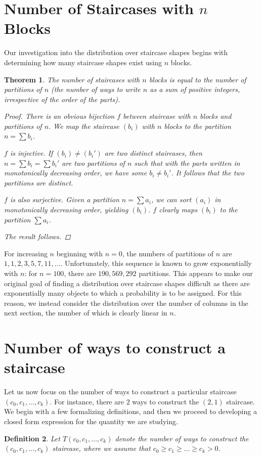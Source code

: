 \documentclass[12pt]{amsart}
\newtheorem{theorem}{Theorem}[section]
\newtheorem{definition}[theorem]{Definition}
\newcommand{\newsection}[2]{
\section{#1 \label{#2}}
}
\begin{document}
\newsection{Number of Staircases with $n$ Blocks}{sec:numstaircases}
Our investigation into the distribution over staircase shapes begins with determining how many staircase shapes exist using $n$ blocks.

\begin{theorem}
The number of staircases with $n$ blocks is equal to the number of partitions of $n$ (the number of ways to write $n$ as a sum of positive integers, irrespective of the order of the parts).
\begin{proof}
There is an obvious bijection $f$ between staircase with $n$ blocks and partitions of $n$. We map the staircase $(b_i)$ with $n$ blocks to the partition $n=\sum b_i$.

$f$ is injective. If $(b_i)\neq (b_i')$ are two distinct staircases, then $n = \sum b_i = \sum b_i'$ are two partitions of $n$ such that with the parts written in monotonically decreasing order, we have some $b_i\neq b_i'$. It follows that the two partitions are distinct.

$f$ is also surjective. Given a partition $n = \sum a_i$, we can sort $(a_i)$ in monotonically decreasing order, yielding $(b_i)$. $f$ clearly maps $(b_i)$ to the partition $\sum a_i$.

The result follows.
\end{proof}
\end{theorem}

For increasing $n$ beginning with $n = 0$, the numbers of partitions of $n$ are $1, 1, 2, 3, 5, 7, 11, \ldots$. Unfortunately, this sequence is known to grow exponentially with $n$: for $n = 100$, there are $190,569,292$ partitions. This appears to make our original goal of finding a distribution over staircase shapes difficult as there are exponentially many objects to which a probability is to be assigned. For this reason, we instead consider the distribution over the number of columns in the next section, the number of which is clearly linear in $n$.

\newsection{Number of ways to construct a staircase}{sec:numconstructions}
Let us now focus on the number of ways to construct a particular staircase $(c_0, c_1, \dots, c_k)$. For instance, there are $2$ ways to construct the $(2,1)$ staircase. We begin with a few formalizing definitions, and then we proceed to developing a closed form expression for the quantity we are studying.

\begin{definition}
Let $T(c_0, c_1, \dots, c_k)$ denote the number of ways to construct the $(c_0, c_1, \dots, c_k)$ staircase, where we assume that $c_0 \geq c_1 \geq \dots \geq c_k > 0$.
\end{definition}
\end{document}
